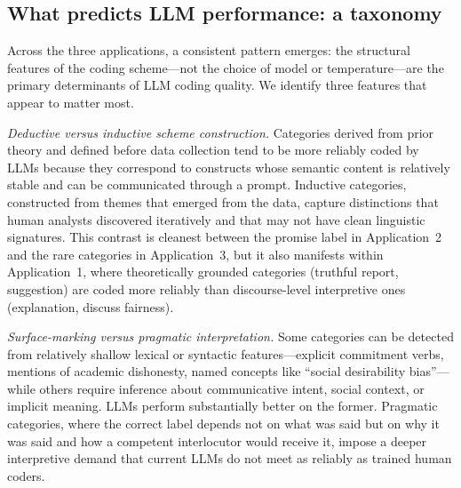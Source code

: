 \documentclass[11pt]{article}
\begin{document}
\begin{sloppypar}

\subsection*{What predicts LLM performance: a taxonomy}

Across the three applications, a consistent pattern emerges: the structural features of the coding scheme---not the choice of model or temperature---are the primary determinants of LLM coding quality. We identify three features that appear to matter most.

\textit{Deductive versus inductive scheme construction.} Categories derived from prior theory and defined before data collection tend to be more reliably coded by LLMs because they correspond to constructs whose semantic content is relatively stable and can be communicated through a prompt. Inductive categories, constructed from themes that emerged from the data, capture distinctions that human analysts discovered iteratively and that may not have clean linguistic signatures. This contrast is cleanest between the promise label in Application~2 and the rare categories in Application~3, but it also manifests within Application~1, where theoretically grounded categories (truthful report, suggestion) are coded more reliably than discourse-level interpretive ones (explanation, discuss fairness).

\textit{Surface-marking versus pragmatic interpretation.} Some categories can be detected from relatively shallow lexical or syntactic features---explicit commitment verbs, mentions of academic dishonesty, named concepts like ``social desirability bias''---while others require inference about communicative intent, social context, or implicit meaning. LLMs perform substantially better on the former. Pragmatic categories, where the correct label depends not on what was said but on why it was said and how a competent interlocutor would receive it, impose a deeper interpretive demand that current LLMs do not meet as reliably as trained human coders.


\end{sloppypar}
\end{document}
